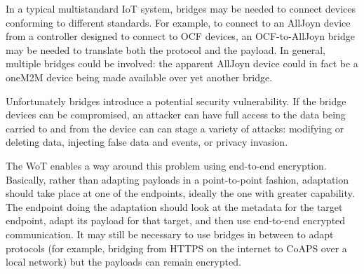 In a typical multistandard IoT system,
bridges may be needed to connect devices
conforming to different standards.
For example,
to connect to an AllJoyn device from a controller
designed to connect to OCF devices, an OCF-to-AllJoyn bridge
may be needed to translate both the protocol and the payload.
In general, multiple bridges could be involved: the
apparent AllJoyn device could in fact be a oneM2M device
being made available over yet another bridge.

Unfortunately bridges introduce a potential security vulnerability.
If the bridge devices can be compromised,
an attacker can have full access to the
data being carried to and from the device can can stage a 
variety of attacks: 
modifying or deleting data,
injecting false data and events,
or privacy invasion.

The WoT enables a way around this problem using end-to-end encryption.
Basically, rather than adapting payloads in a point-to-point fashion,
adaptation should take place at one of the endpoints, ideally the
one with greater capability.  The endpoint doing the adaptation should
look at the metadata for the target endpoint, adapt its payload for that
target, and then use end-to-end encrypted communication.
It may still be necessary to use bridges in between to adapt protocols
(for example, bridging from HTTPS on the internet to CoAPS over a local
network) but the payloads can remain encrypted.

